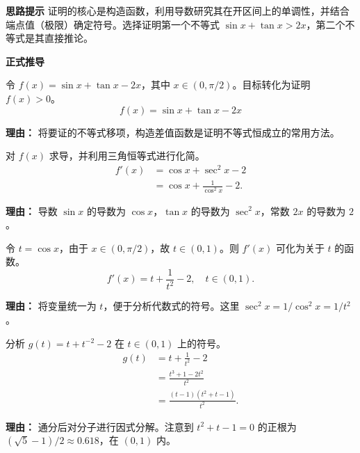 \begin{proofbox}
\textbf{\textcolor{CProof}{思路提示}}
证明的核心是构造函数，利用导数研究其在开区间上的单调性，并结合端点值（极限）确定符号。选择证明第一个不等式 $\sin x + \tan x > 2x$，第二个不等式是其直接推论。

\medskip
\textbf{\textcolor{CProof}{正式推导}}
\begin{description}[style=nextline, leftmargin=2.8em, labelsep=0.5em, itemsep=0.55em]
    \item[\textbf{步骤一（构造函数）：}] 令 $f(x) = \sin x + \tan x - 2x$，其中 $x \in (0, \pi/2)$。目标转化为证明 $f(x) > 0$。
    \[
    f(x) = \sin x + \tan x - 2x
    \]
    \par\textbf{理由：} 将要证的不等式移项，构造差值函数是证明不等式恒成立的常用方法。

    \item[\textbf{步骤二（求导化简）：}] 对 $f(x)$ 求导，并利用三角恒等式进行化简。
    \[
    \begin{aligned}
    f'(x) &= \cos x + \sec^2 x - 2 \\
          &= \cos x + \frac{1}{\cos^2 x} - 2.
    \end{aligned}
    \]
    \par\textbf{理由：} 导数 $\sin x$ 的导数为 $\cos x$，$\tan x$ 的导数为 $\sec^2 x$，常数 $2x$ 的导数为 $2$。

    \item[\textbf{步骤三（二次换元）：}] 令 $t = \cos x$，由于 $x \in (0, \pi/2)$，故 $t \in (0, 1)$。则 $f'(x)$ 可化为关于 $t$ 的函数。
    \[
    f'(x) = t + \frac{1}{t^2} - 2, \quad t \in (0,1).
    \]
    \par\textbf{理由：} 将变量统一为 $t$，便于分析代数式的符号。这里 $\sec^2 x = 1/\cos^2 x = 1/t^2$。

    \item[\textbf{步骤四（判断导函数符号）：}] 分析 $g(t) = t + t^{-2} - 2$ 在 $t \in (0,1)$ 上的符号。
    \[
    \begin{aligned}
    g(t) &= t + \frac{1}{t^2} - 2 \\
         &= \frac{t^3 + 1 - 2t^2}{t^2} \\
         &= \frac{(t-1)(t^2 + t - 1)}{t^2}.
    \end{aligned}
    \]
    \par\textbf{理由：} 通分后对分子进行因式分解。注意到 $t^2+t-1=0$ 的正根为 $(\sqrt{5}-1)/2 \approx 0.618$，在 $(0,1)$ 内。


\end{description}
\end{proofbox}
